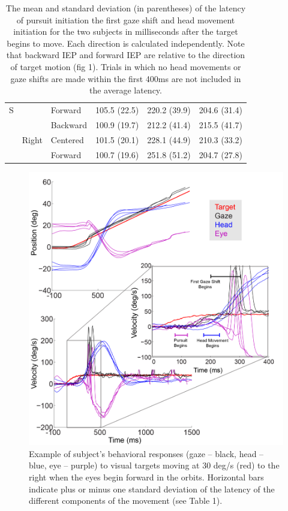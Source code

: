 \documentclass[12pt]{article}
\begin{document}
\begin{table}[h]
\begin{tabular}{@{}lllccc@{}}
\multicolumn{1}{c}{S} & \cellcolor[HTML]{EFEFEF}     & \cellcolor[HTML]{EFEFEF}Forward  & \cellcolor[HTML]{EFEFEF}105.5 (22.5) & \cellcolor[HTML]{EFEFEF}220.2 (39.9) & \cellcolor[HTML]{EFEFEF}204.6 (31.4) \\
                      &                              & Backward                         & 100.9 (19.7)                         & 212.2 (41.4)                         & 215.5 (41.7)                         \\
                      & Right                        & Centered                         & 101.5 (20.1)                         & 228.1 (44.9)                         & 210.3 (33.2)                         \\
                      &                              & Forward                          & 100.7 (19.6)                         & 251.8 (51.2)                         & 204.7 (27.8)                         \\ \bottomrule
\end{tabular}
\caption[Latency]{The mean and standard deviation (in parentheses) of the latency of pursuit initiation the first gaze shift and head movement initiation for the two subjects in milliseconds after the target begins to move. Each direction is calculated independently. Note that backward IEP and forward IEP are relative to the direction of target motion (fig 1).  Trials in which no head movements or gaze shifts are made within the first 400ms are not included in the average latency.}
\label{tab:Ramp}
\end{table}

\begin{figure}[h]
\centering
\includegraphics[width=0.7\linewidth]{./figs/ForwardIEP}
\caption[Behavior during Forward IEP]{Example of subject's behavioral responses (gaze – black, head – blue, eye – purple) to visual targets moving at 30 deg/s (red) to the right when the eyes begin forward in the orbits. Horizontal bars indicate plus or minus one standard deviation of the latency of the different components of the movement (see Table 1).
}
\label{fig:ForwardIEP}
\end{figure}
\end{document}
